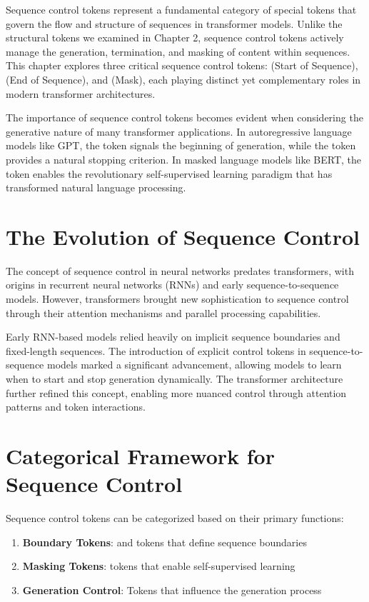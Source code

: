 
Sequence control tokens represent a fundamental category of special tokens that govern the flow and structure of sequences in transformer models. Unlike the structural tokens we examined in Chapter 2, sequence control tokens actively manage the generation, termination, and masking of content within sequences. This chapter explores three critical sequence control tokens: \sos{} (Start of Sequence), \eos{} (End of Sequence), and \mask{} (Mask), each playing distinct yet complementary roles in modern transformer architectures.

The importance of sequence control tokens becomes evident when considering the generative nature of many transformer applications. In autoregressive language models like GPT, the \sos{} token signals the beginning of generation, while the \eos{} token provides a natural stopping criterion. In masked language models like BERT, the \mask{} token enables the revolutionary self-supervised learning paradigm that has transformed natural language processing.

\section{The Evolution of Sequence Control}

The concept of sequence control in neural networks predates transformers, with origins in recurrent neural networks (RNNs) and early sequence-to-sequence models. However, transformers brought new sophistication to sequence control through their attention mechanisms and parallel processing capabilities.

Early RNN-based models relied heavily on implicit sequence boundaries and fixed-length sequences. The introduction of explicit control tokens in sequence-to-sequence models marked a significant advancement, allowing models to learn when to start and stop generation dynamically. The transformer architecture further refined this concept, enabling more nuanced control through attention patterns and token interactions.

\section{Categorical Framework for Sequence Control}

Sequence control tokens can be categorized based on their primary functions:

\begin{enumerate}
\item \textbf{Boundary Tokens}: \sos{} and \eos{} tokens that define sequence boundaries
\item \textbf{Masking Tokens}: \mask{} tokens that enable self-supervised learning
\item \textbf{Generation Control}: Tokens that influence the generation process
\end{enumerate}

